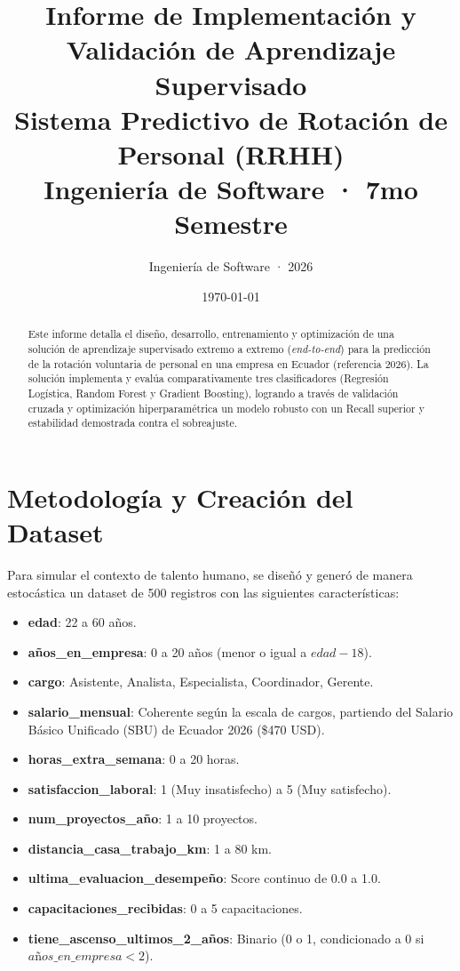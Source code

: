 \documentclass[11pt,a4paper]{article}
\title{\textbf{Informe de Implementación y Validación de Aprendizaje Supervisado}\\
\large Sistema Predictivo de Rotación de Personal (RRHH)\\
\normalsize Ingeniería de Software · 7mo Semestre}
\author{Ingeniería de Software · 2026}
\date{\today}
\begin{document}
\maketitle

\begin{abstract}
Este informe detalla el diseño, desarrollo, entrenamiento y optimización de una solución de aprendizaje supervisado extremo a extremo (\textit{end-to-end}) para la predicción de la rotación voluntaria de personal en una empresa en Ecuador (referencia 2026). La solución implementa y evalúa comparativamente tres clasificadores (Regresión Logística, Random Forest y Gradient Boosting), logrando a través de validación cruzada y optimización hiperparamétrica un modelo robusto con un Recall superior y estabilidad demostrada contra el sobreajuste.
\end{abstract}

\section{Metodología y Creación del Dataset}
Para simular el contexto de talento humano, se diseñó y generó de manera estocástica un dataset de 500 registros con las siguientes características:
\begin{itemize}
    \item \textbf{edad}: 22 a 60 años.
    \item \textbf{años\_en\_empresa}: 0 a 20 años (menor o igual a $edad - 18$).
    \item \textbf{cargo}: Asistente, Analista, Especialista, Coordinador, Gerente.
    \item \textbf{salario\_mensual}: Coherente según la escala de cargos, partiendo del Salario Básico Unificado (SBU) de Ecuador 2026 (\$470 USD).
    \item \textbf{horas\_extra\_semana}: 0 a 20 horas.
    \item \textbf{satisfaccion\_laboral}: 1 (Muy insatisfecho) a 5 (Muy satisfecho).
    \item \textbf{num\_proyectos\_año}: 1 a 10 proyectos.
    \item \textbf{distancia\_casa\_trabajo\_km}: 1 a 80 km.
    \item \textbf{ultima\_evaluacion\_desempeño}: Score continuo de 0.0 a 1.0.
    \item \textbf{capacitaciones\_recibidas}: 0 a 5 capacitaciones.
    \item \textbf{tiene\_ascenso\_ultimos\_2\_años}: Binario (0 o 1, condicionado a 0 si $años\_en\_empresa < 2$).
\end{itemize}
\end{document}
